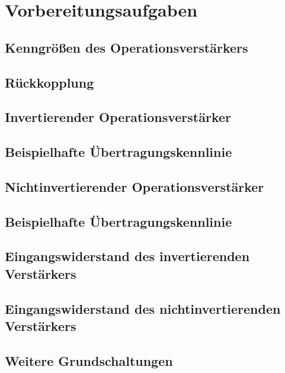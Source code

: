 \documentclass[a4paper, 12pt]{article}
\begin{document}
  
  \clearpage
  \setcounter{page}{1}

\section{Vorbereitungsaufgaben}

\subsection{Kenngrößen des Operationsverstärkers}


\subsection{Rückkopplung}


\subsection{Invertierender Operationsverstärker}


\subsection{Beispielhafte Übertragungskennlinie}


\subsection{Nichtinvertierender Operationsverstärker}


\subsection{Beispielhafte Übertragungskennlinie}


\subsection{Eingangswiderstand des invertierenden Verstärkers}


\subsection{Eingangswiderstand des nichtinvertierenden Verstärkers}


\subsection{Weitere Grundschaltungen}

\end{document}
